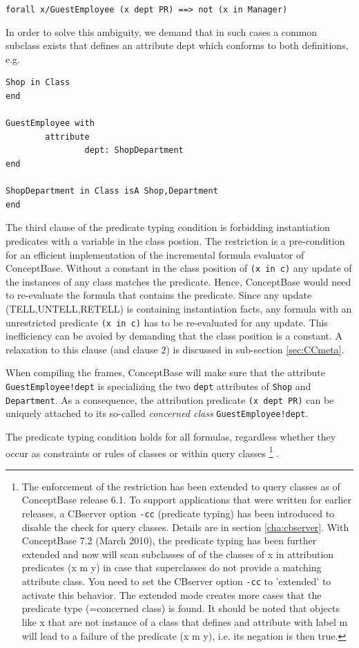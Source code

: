 {\tt forall x/GuestEmployee (x dept PR) ==> not (x in Manager)}


In order to solve this ambiguity, we demand that in such cases a common
subclass exists that defines an attribute dept which conforms to both
definitions, e.g.

\begin{verbatim}
Shop in Class
end

GuestEmployee with
        attribute
                dept: ShopDepartment
end

ShopDepartment in Class isA Shop,Department
end
\end{verbatim}


The third clause of the predicate typing condition is forbidding instantiation
predicates with a variable in the class postion. The restriction is a pre-condition
for an efficient implementation of the incremental formula evaluator of ConceptBase.
Without a constant in the class position of {\tt (x in c)} any update of the instances
of any class matches the predicate. Hence, ConceptBase would need to re-evaluate the
formula that contains the predicate. Since any update (TELL,UNTELL,RETELL) is 
containing instantiation facts, any formula with an unrestricted predicate {\tt (x in c)}
has to be re-evaluated for any update. This inefficiency can be avoied by demanding
that the class position is a constant. A relaxation to this clause (and clause 2) is
discussed in sub-section \ref{sec:CCmeta}.



When compiling the frames, ConceptBase will make sure that the
attribute {\tt GuestEmployee!dept} is specializing the two {\tt dept}
attributes of {\tt Shop} and {\tt Department}. As a consequence,
the attribution predicate {\tt (x dept PR)} can be uniquely attached to its so-called
{\em concerned class\/} {\tt GuestEmployee!dept}.

The predicate typing condition holds for all formulas, regardless whether
they occur as constraints or rules of classes or within query classes%
\footnote{The enforcement of the restriction has been extended to query classes
as of ConceptBase release 6.1. To support applications that were written
for earlier releases, a CBserver option {\tt -cc} (predicate typing) has been introduced to
disable the check for query classes. Details are in section \ref{cha:cbserver}.
With ConceptBase 7.2 (March 2010), the predicate typing has been further extended
and now will scan subclasses of of the classes of x in attribution predicates
(x m y) in case that superclasses do not provide a matching attribute class.
You need to set the CBserver option {\tt -cc} to 'extended' to activate this behavior.
The extended mode creates more cases that the predicate type (=concerned class)
is found. It should be noted that objects like x that are not instance
of a class that defines and attribute with label m will lead to a failure
of the predicate (x m y), i.e. its negation is then true.}%
.


